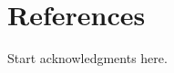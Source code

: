 \documentclass[twocol]{ametsoc}
\begin{document}
\section{References}

%
\acknowledgments
Start acknowledgments here.

%






%
%
%


\end{document}
